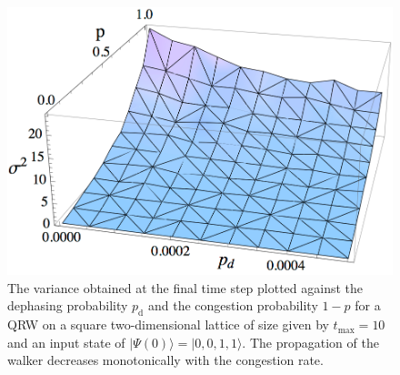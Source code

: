 \documentclass[aps,pra,twocolumn,amsmath,amssymb,nofootinbib,superscriptaddress]{revtex4}
\newcommand{\ket}[1]{|#1\rangle}
\begin{document}
\begin{figure}[]
\includegraphics[scale=0.5]{DepPercVar.pdf}
\caption{\label{fig:DepPercVar} The variance obtained at the final time step plotted against the dephasing probability $p_{\mathrm{d}}$ and the congestion probability $1-p$ for a QRW on a square two-dimensional lattice of size given by $t_\mathrm{max}=10$ and an input state of $\ket{\Psi(0)}=\ket{0,0,1,1}$. The propagation of the walker decreases monotonically with the congestion rate.}
\end{figure}
\end{document}
